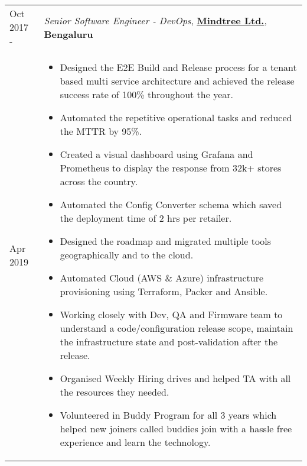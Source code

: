 \documentclass[11pt, a4paper]{article}
\begin{document}
\vspace{4mm}

\noindent\begin{tabular}{L{1.7cm}!{\color{gray}\vrule}l}
Oct 2017 -  & \textit{Senior Software Engineer - DevOps}, \textcolor{NavyBlue}{\textbf{\href{https://www.mindtree.com}{Mindtree Ltd.}}},  \textbf{Bengaluru} \\
Apr 2019 &
  \begin{minipage}[t]{0.86\textwidth}
    \begin{itemize}[leftmargin=*]
    \itemsep-0.5em 
    \item Designed the E2E Build and Release process for a tenant based multi service architecture and achieved the release success rate of 100\% throughout the year.
    \item Automated the repetitive operational tasks and reduced the MTTR by 95\%.
    \item Created a visual dashboard using Grafana and Prometheus to display the response from 32k+ stores across the country.
    \item Automated the Config Converter schema which saved the deployment time of 2 hrs per retailer.
    \item Designed the roadmap and migrated multiple tools geographically and to the cloud.
    \item Automated Cloud (AWS \& Azure) infrastructure provisioning using Terraform, Packer and Ansible.
    \item Working closely with Dev, QA and Firmware team to understand a code/configuration release scope,
maintain the infrastructure state and post-validation after the release.
    \item Organised Weekly Hiring drives and helped TA with all the resources they needed.
    \item Volunteered in Buddy Program for all 3 years which helped new joiners called buddies join with a hassle free experience and learn the technology.
    \end{itemize}
  \end{minipage}
\end{tabular} 

\vspace{4mm}
\end{document}
